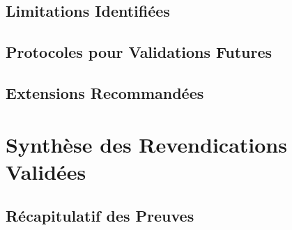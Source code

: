 {\subsection{Limitations Identifiées}
\label{subsec:limitations_identifiees}

\subsection{Protocoles pour Validations Futures}
\label{subsec:protocoles_futurs}

\subsection{Extensions Recommandées}
\label{subsec:extensions_recommandees}

\section{Synthèse des Revendications Validées}
\label{sec:synthese_revendications}

\subsection{Récapitulatif des Preuves}
\label{subsec:recapitulatif_preuves}

}

